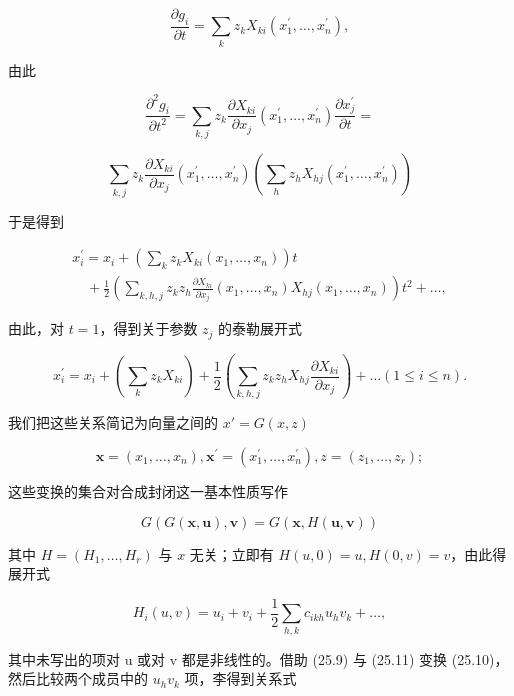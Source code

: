 \[
\frac {\partial g _ {i}}{\partial t} = \sum_ {k} z _ {k} X _ {k i} (x _ {1} ^ {\prime}, \dots , x _ {n} ^ {\prime}),
\]

由此

\[
\frac {\partial^ {2} g _ {i}}{\partial t ^ {2}} = \sum_ {k, j} z _ {k} \frac {\partial X _ {k i}}{\partial x _ {j}} (x _ {1} ^ {\prime}, \dots , x _ {n} ^ {\prime}) \frac {\partial x _ {j} ^ {\prime}}{\partial t} =
\]

\[
\sum_ {k, j} z _ {k} \frac {\partial X _ {k i}}{\partial x _ {j}} (x _ {1} ^ {\prime}, \dots , x _ {n} ^ {\prime}) \left(\sum_ {h} z _ {h} X _ {h j} (x _ {1} ^ {\prime}, \dots , x _ {n} ^ {\prime})\right)
\]

于是得到

\[
\begin{array}{l} x _ {i} ^ {\prime} = x _ {i} + \left(\sum_ {k} z _ {k} X _ {k i} (x _ {1}, \dots , x _ {n})\right) t \\ \quad + \frac {1}{2} \left(\sum_ {k, h, j} z _ {k} z _ {h} \frac {\partial X _ {k i}}{\partial x _ {j}} (x _ {1}, \dots , x _ {n}) X _ {h j} (x _ {1}, \dots , x _ {n})\right) t ^ {2} + \dots , \end{array}
\]

由此，对 \(t = 1\)，得到关于参数 \(z_{j}\) 的泰勒展开式

\[
x _ {i} ^ {\prime} = x _ {i} + \left(\sum_ {k} z _ {k} X _ {k i}\right) + \frac {1}{2} \left(\sum_ {k, h, j} z _ {k} z _ {h} X _ {h j} \frac {\partial X _ {k i}}{\partial x _ {j}}\right) + \dots (1 \leq i \leq n).\tag{25.9}
\]

我们把这些关系简记为向量之间的 \(x' = G(x, z)\)

\[
\boldsymbol {x} = (x _ {1}, \dots , x _ {n}), \boldsymbol {x} ^ {\prime} = (x _ {1} ^ {\prime}, \dots , x _ {n} ^ {\prime}), z = (z _ {1}, \dots , z _ {r});
\]

这些变换的集合对合成封闭这一基本性质写作

\[
G (G (\boldsymbol {x}, \boldsymbol {u}), \boldsymbol {v}) = G (\boldsymbol {x}, H (\boldsymbol {u}, \boldsymbol {v}))\tag{25.10}
\]

其中 \(H = (H_{1},\ldots ,H_{r})\) 与 \(x\) 无关；立即有 \(H(u,0) = u,H(0,v) = v\)，由此得展开式

\[
H _ {i} (u, v) = u _ {i} + v _ {i} + \frac {1}{2} \sum_ {h, k} c _ {i k h} u _ {h} v _ {k} + \dots ,\tag{25.11}
\]

其中未写出的项对 u 或对 v 都是非线性的。借助 (25.9) 与 (25.11) 变换 (25.10)，然后比较两个成员中的 \(u_{h}v_{k}\) 项，李得到关系式

